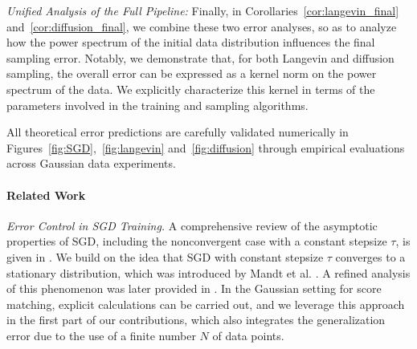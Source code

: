 \documentclass[11pt]{article}
\begin{document}
\noindent\textit{Unified Analysis of the Full Pipeline:}  
    Finally, in Corollaries~\ref{cor:langevin_final} and~\ref{cor:diffusion_final}, we combine these two error analyses, so as to analyze how the power spectrum of the initial data distribution influences the final sampling error. Notably, we demonstrate that, for both Langevin and diffusion sampling, the overall error can be expressed as a kernel norm on the power spectrum of the data. We explicitly characterize this kernel in terms of the parameters involved in the training and sampling algorithms.
    
All theoretical error predictions are carefully validated numerically in Figures~\ref{fig:SGD},~\ref{fig:langevin} and~\ref{fig:diffusion} through empirical evaluations across Gaussian data experiments.

\paragraph{Related Work}

\noindent\textit{Error Control in SGD Training.}
%
A comprehensive review of the asymptotic properties of SGD, including the nonconvergent case with a constant stepsize $\tau$, is given in \cite{bottou2018optimization}.
We build on the idea that SGD with constant stepsize $\tau$ converges to a stationary distribution, which was introduced by Mandt et al. \cite{mandt2016variational}.
A refined analysis of this phenomenon was later provided in \cite{dieuleveut2020bridging}.
In the Gaussian setting for score matching, explicit calculations can be carried out, and we leverage this approach in the first part of our contributions, which also integrates the generalization error due to the use of a finite number $N$ of data points.
\end{document}
